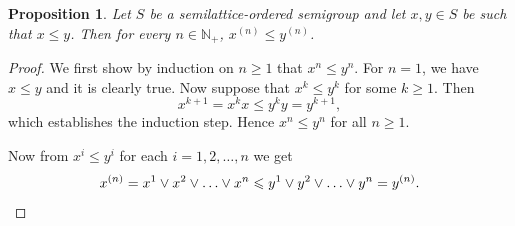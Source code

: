 \documentclass[10pt, reqno]{amsart}
\theoremstyle{plain}
\newtheorem{prop}[theorem]{Proposition}
\theoremstyle{definition}
\begin{document}
\begin{prop}\label{power_proposition}
    Let $S$ be a semilattice-ordered semigroup and let $x,y \in S$ be such that $x \leqslant y$. Then for every $n \in \mathbb{N}_+$, $x^{(n)} \leqslant y^{(n)}$. 
\end{prop}
\begin{proof}
    We first show by induction on $n \geqslant 1$ that $x^n \leqslant y^n$. For $n = 1$, we have $x \leqslant y$ and it is clearly true. Now suppose that $x^k \leqslant y^k$ for some $k \geqslant 1$. Then 
    \begin{equation*}
        x^{k + 1} = x^kx \leqslant y^ky = y^{k + 1},
    \end{equation*}
    which establishes the induction step. Hence $x^n \leqslant y^n$ for all $n \geqslant 1$.
    
    Now from $x^i \leqslant y^i$ for each $i = 1,2,\ldots, n$ we get 
    \begin{equation*}
        x^{(n)} = x^1 \lor x^2 \lor \ldots \lor x^n \leqslant y^1 \lor y^2 \lor \ldots \lor y^n = y^{(n)}. \qedhere
    \end{equation*}
\end{proof}
\end{document}
